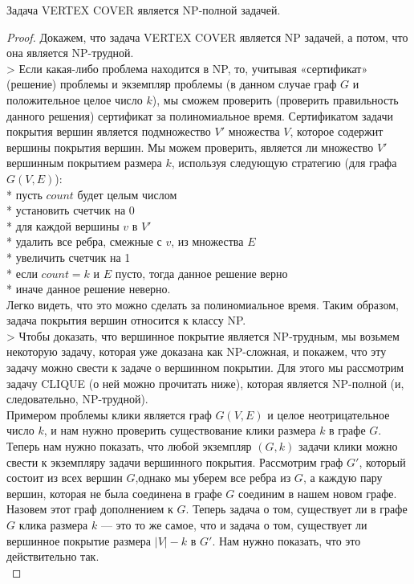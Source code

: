     \begin{Thm}
        Задача VERTEX COVER является NP-полной задачей.
    \end{Thm}
    
    \begin{proof}
        Докажем, что задача VERTEX COVER является NP задачей, а потом, что она является NP-трудной.\\
        > Если какая-либо проблема находится в NP, то, учитывая «сертификат» (решение) проблемы и экземпляр проблемы (в данном случае граф $G$ и положительное целое число $k$), мы сможем проверить (проверить правильность данного решения) сертификат за полиномиальное время.
        Сертификатом задачи покрытия вершин является подмножество $V'$ множества $V$, которое содержит вершины покрытия вершин. Мы можем проверить, является ли множество $V'$ вершинным покрытием размера $k$, используя следующую стратегию (для графа $G(V, E)$):\\
        * пусть $count$ будет целым числом\\
        * установить счетчик на 0\\
        * для каждой вершины $v$ в $V'$\\
        * удалить все ребра, смежные с $v$, из множества $E$\\
        * увеличить счетчик на 1\\
        * если $count = k$ и $E$ пусто, тогда данное решение верно\\
        * иначе данное решение неверно.\\
        Легко видеть, что это можно сделать за полиномиальное время. Таким образом, задача покрытия вершин относится к классу NP.\\
        > Чтобы доказать, что вершинное покрытие является NP-трудным, мы возьмем некоторую задачу, которая уже доказана как NP-сложная, и покажем, что эту задачу можно свести к задаче о вершинном покрытии. Для этого мы рассмотрим задачу CLIQUE (о ней можно прочитать ниже), которая является NP-полной (и, следовательно, NP-трудной).\\
        Примером проблемы клики является граф $G(V, E)$ и целое неотрицательное число $k$, и нам нужно проверить существование клики размера $k$ в графе $G$.\\
        Теперь нам нужно показать, что любой экземпляр $(G, k)$ задачи клики можно свести к экземпляру задачи вершинного покрытия. Рассмотрим граф $G'$, который состоит из всех вершин $G$,однако мы уберем все ребра из $G$, а каждую пару вершин, которая не была соединена в графе $G$ соединим в нашем новом графе. Назовем этот граф дополнением к $G$. Теперь задача о том, существует ли в графе $G$ клика размера $k$ --- это то же самое, что и задача о том, существует ли вершинное покрытие размера $|V| - k$ в $G'$. Нам нужно показать, что это действительно так.\\

\end{proof}
